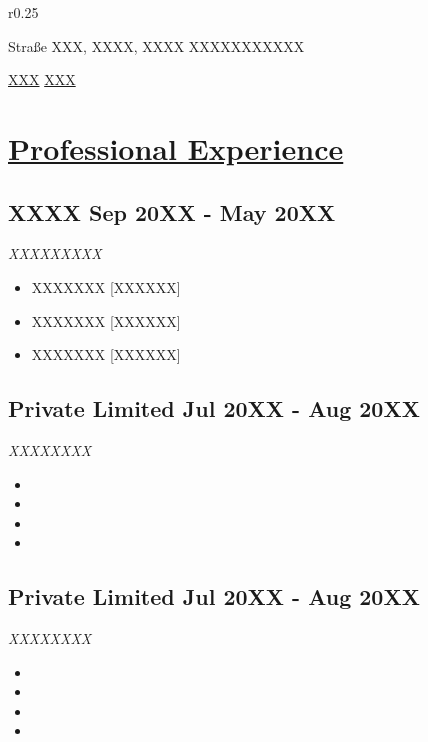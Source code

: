 \documentclass[a4paper,11pt]{article}
\newcommand{\longunderline}[1]{\uline{#1\hfill\mbox{}}}
\begin{document}
\begin{wrapfigure}[4]{r}{0.25\textwidth}
    \vspace{-2.3 cm}
    \vspace{-2.3 cm}
\end{wrapfigure}


\textbf{\Huge\color{MidnightBlue}{Name}}\href{}{}

Straße XXX, XXXX, XXXX \textbar{}  XXXXXXXXXXX 

\href{mailto:}{ XXX}
\href{}{ XXX}

\section*{\longunderline{Professional Experience}}
    \subsection*{XXXX \hfill Sep 20XX - May 20XX} 
        \emph{XXXXXXXXX}
            \begin{itemize}[noitemsep,topsep=0pt]
				\item XXXXXXX \hfill [XXXXXX]
				\item XXXXXXX \hfill [XXXXXX]
				\item XXXXXXX \hfill [XXXXXX]
            \end{itemize}
    
    \subsection*{Private Limited \hfill Jul 20XX - Aug 20XX} 	
        \emph{XXXXXXXX}
        \vspace{-0.9em}
            \begin{itemize}	[noitemsep,topsep=0pt]
                \item 
                \item 
                \item 
                \item 
            \end{itemize}
            
     \subsection*{Private Limited \hfill Jul 20XX - Aug 20XX} 	
        \emph{XXXXXXXX}
        \vspace{-0.9em}
            \begin{itemize}	[noitemsep,topsep=0pt]
                \item 
                \item 
                \item 
                \item 
            \end{itemize}
           
\end{document}
